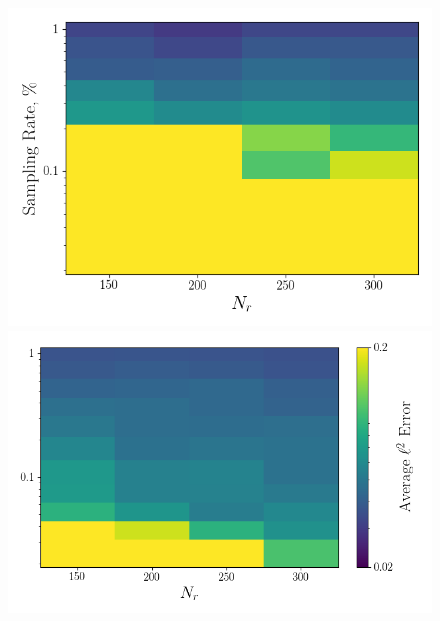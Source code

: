 \begin{figure}
	\begin{minipage}{0.46\linewidth}
		\includegraphics[width=0.99\linewidth]{Chapters/HPROMResults/Images/cvrc/deim/err_contour_random_dt1e-6.png}
	\end{minipage}
	\begin{minipage}{0.53\linewidth}
		\includegraphics[width=0.99\linewidth]{Chapters/HPROMResults/Images/cvrc/deim/err_contour_eigenvec_dt1e-6.png}
	\end{minipage}


\end{figure}
